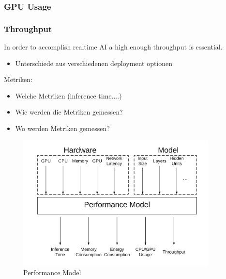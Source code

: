\subsubsection{GPU Usage}
\subsubsection{Throughput}
In order to accomplish realtime AI a high enough throughput is essential.
\begin{itemize}
    \item Unterschiede aus verschiedenen deployment optionen
\end{itemize}
Metriken:
\begin{itemize}
    \item Welche Metriken (inference time....)
    \item Wie werden die Metriken gemessen?
    \item Wo werden Metriken gemessen?
\end{itemize}
\begin{figure}[H]
\centering
\includegraphics[width=0.9\textwidth]{./Bilder/trade_offs.png}
\caption{Performance Model}
\label{fig:perf_model}
\end{figure}
\endinput 